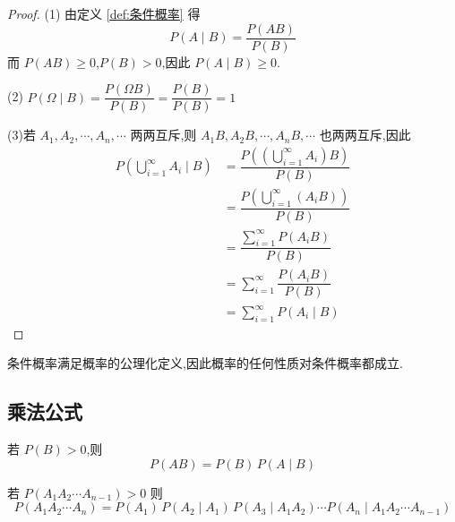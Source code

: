 \begin{proof}
    (1) 由定义 \ref{def:条件概率} 得
    $$P(A \mid B) = \dfrac{P(AB)}{P(B)}$$
    而 $P(AB) \geqslant 0$,$P(B)>0$,因此 $P(A \mid B) \geqslant 0$.

    \vspace{0.5em}

    (2) $P(\varOmega \mid B) = \dfrac{P(\varOmega B)}{P(B)} = \dfrac{P(B)}{P(B)} = 1$

    \vspace{0.5em}

    (3)若 $A_1, A_2, \cdots, A_n, \cdots$ 两两互斥,则 $A_1 B, A_2 B, \cdots, A_n B, \cdots$ 也两两互斥,因此
    $$
    \begin{aligned}
        P \left( \bigcup_{i=1}^{\infty} A_i \mid B \right) &= \dfrac{P \left( \left( \displaystyle\bigcup_{i=1}^{\infty} A_i \right) B \right)}{P(B)} \\
        &= \dfrac{P \left( \displaystyle\bigcup_{i=1}^{\infty} (A_i B) \right)}{P(B)} \\
        &= \dfrac{\displaystyle\sum_{i=1}^{\infty} P(A_i B)}{P(B)} \\
        &= \sum_{i=1}^{\infty} \dfrac{P(A_i B)}{P(B)} \\
        &= \sum_{i=1}^{\infty} P(A_i \mid B)
    \end{aligned}
    $$

    \vspace{-2em}
\end{proof}

\begin{note}
    \indent 条件概率满足概率的公理化定义,因此概率的任何性质对条件概率都成立.
\end{note}

\subsection{乘法公式}

\begin{theorem}[][乘法公式]
    \indent 若 $P(B)>0$,则
    \begin{equation} \label{equation:乘法公式}
        P(AB) = P(B) \, P(A \mid B)    
    \end{equation}
    
    若 $P(A_1 A_2 \cdots A_{n-1}) > 0$ 则
    \begin{equation} \label{equation:一般的乘法公式}
        P(A_1 A_2 \cdots A_n) = P(A_1) \, P(A_2 \mid A_1) \, P(A_3 \mid A_1 A_2) \cdots P(A_n \mid A_1 A_2 \cdots A_{n-1})
    \end{equation}
\end{theorem}

